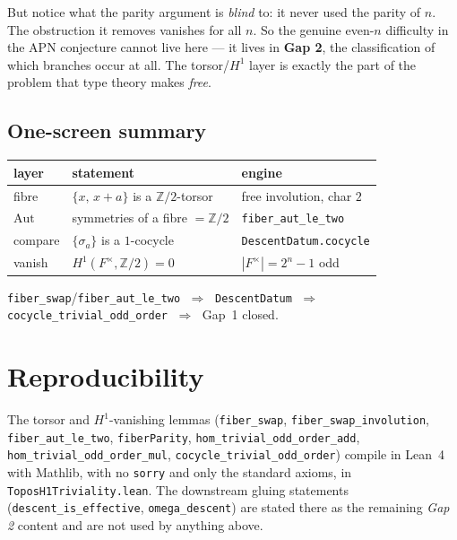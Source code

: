 \documentclass[11pt]{article}
\begin{document}
\medskip
\noindent
But notice what the parity argument is \emph{blind} to: it never used the parity
of $n$. The obstruction it removes vanishes for all $n$. So the genuine
even-$n$ difficulty in the APN conjecture cannot live here --- it lives in
\textbf{Gap 2}, the classification of which branches occur at all. The torsor/$H^1$
layer is exactly the part of the problem that type theory makes \emph{free}.

\bigskip
\subsection*{One-screen summary}

\begin{center}
\renewcommand{\arraystretch}{1.6}
\begin{tabular}{l l l}
\textbf{layer} & \textbf{statement} & \textbf{engine} \\
\hline
fibre & $\{x,\,x+a\}$ is a $\mathbb{Z}/2$-torsor & free involution, char $2$ \\
$\mathrm{Aut}$ & symmetries of a fibre $=\mathbb{Z}/2$ & \texttt{fiber\_aut\_le\_two} \\
compare & $\{\sigma_a\}$ is a $1$-cocycle & \texttt{DescentDatum.cocycle} \\
vanish & $H^1(F^\times,\mathbb{Z}/2)=0$ & $|F^\times|=2^{n}{-}1$ odd \\
\end{tabular}
\end{center}

\bigskip
\noindent
\colorbox{leanbg}{\parbox{\dimexpr\linewidth-2\fboxsep}{\centering
\texttt{fiber\_swap}/\texttt{fiber\_aut\_le\_two}
$\;\Rightarrow\;$ \texttt{DescentDatum}
$\;\Rightarrow\;$ \texttt{cocycle\_trivial\_odd\_order}
$\;\Rightarrow\;$ Gap~1 closed.}}

\bigskip

\section*{Reproducibility}

\noindent
The torsor and $H^1$-vanishing lemmas
(\texttt{fiber\_swap}, \texttt{fiber\_swap\_involution},
\texttt{fiber\_aut\_le\_two}, \texttt{fiberParity},
\texttt{hom\_trivial\_odd\_order\_add}, \texttt{hom\_trivial\_odd\_order\_mul},
\texttt{cocycle\_trivial\_odd\_order}) compile in Lean~4 with Mathlib, with no
\texttt{sorry} and only the standard axioms, in
\texttt{ToposH1Triviality.lean}. The downstream gluing statements
(\texttt{descent\_is\_effective}, \texttt{omega\_descent}) are stated there as
the remaining \emph{Gap 2} content and are not used by anything above.
\end{document}
